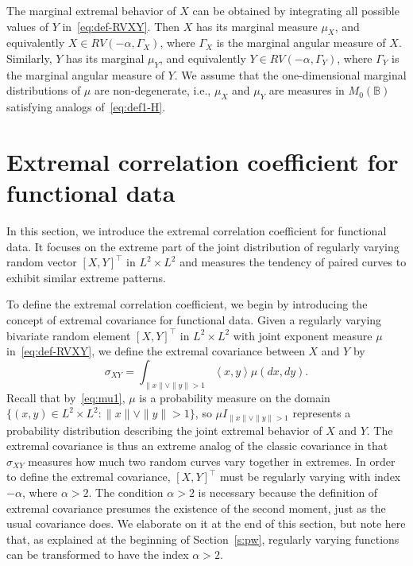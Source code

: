 \documentclass[lineno]{biometrika}
\newcommand \ag{\alpha}
\newcommand \Gg{\Gamma}
\newcommand \sg{\sigma}
\newcommand\mbB{{\mathbb B}}
\newcommand\lip{\left \langle}
\newcommand\rip{\right \rangle}
\begin{document}
The  marginal extremal behavior of $X$ can be obtained by integrating all
possible values of $Y$ in~\eqref{eq:def-RVXY}.  Then $X$ has its marginal measure $\mu_X$, and equivalently $X \in RV(-\ag, \Gg_X)$, where $\Gg_X$ is the marginal angular measure of $X$. Similarly, $Y$ has its  marginal $\mu_Y$, and equivalently $Y \in RV(-\ag, \Gg_Y)$, where $\Gg_Y$ is the marginal angular measure of $Y$. We assume that the one-dimensional marginal distributions of $\mu$ are non-degenerate, i.e., $\mu_X$ and $\mu_Y$ are measures in $M_0(\mbB)$ satisfying analogs of~\eqref{eq:def1-H}.




\section{Extremal correlation coefficient for functional data} \label{s:ecc}
In this section, we introduce the extremal correlation coefficient for functional data. It focuses on the extreme part of the joint distribution of regularly varying random vector $[X,Y]^{\top}$ in $L^2 \times L^2$ and measures the tendency of paired curves to exhibit similar extreme patterns.



To define the extremal correlation coefficient, we begin by introducing the concept of extremal covariance for functional data. Given a regularly varying bivariate random element $[X,Y]^{\top}$ in $L^2\times L^2$ with joint exponent measure $\mu$ in~\eqref{eq:def-RVXY}, we define the extremal covariance between $X$ and $Y$ by
\begin{equation} \label{eq:cov}
    \sg_{XY} = \int_{\|x\| \vee \|y\|>1} \lip x, y \rip  \mu(dx, dy).
\end{equation}
Recall that by~\eqref{eq:mu1}, $\mu$ is a probability measure on the domain $\{(x,y) \in L^2 \times L^2:\|x\| \vee \|y\|>1\}$, so $\mu I_{\|x\| \vee \|y\|>1}$ represents a probability distribution describing the  joint extremal behavior of $X$ and $Y$. The extremal covariance is thus an extreme analog of the classic covariance in that $\sg_{XY}$ measures how much two random curves vary together in extremes. In order to define the extremal covariance, $[X,Y]^{\top}$ must be regularly varying with index $-\ag$, where $\ag>2$.  The condition $\ag>2$ is necessary because the definition of extremal covariance presumes the existence of the second moment, just as the usual covariance does. We elaborate on it at the end of this
section, but note here that, as explained at the beginning of Section~\ref{s:pw},
regularly varying functions can be transformed to have the index $\ag>2$.
\end{document}
